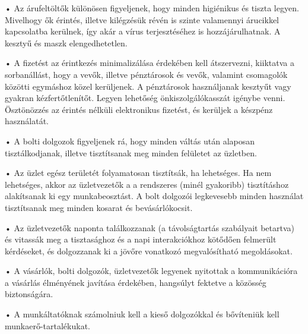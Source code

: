 \documentclass[onecolumn,journal]{IEEEtran}
\begin{document}
\begin{multicols}{2}
• Az árufeltöltők különösen figyeljenek, hogy minden higiénikus és tiszta legyen. Mivelhogy ők érintés, illetve kilégzésük révén is szinte valamennyi árucikkel kapcsolatba kerülnek, így akár a vírus terjesztéséhez is hozzájárulhatnak. A kesztyű és maszk elengedhetetlen.

• A fizetést az érintkezés minimalizálása érdekében kell átszervezni, kiiktatva a sorbanállást, hogy a vevők, illetve pénztárosok és vevők, valamint csomagolók közötti egymáshoz közel kerüljenek. A pénztárosok használjanak kesztyűt vagy gyakran kézfertőtlenítőt. Legyen lehetőség önkiszolgálókasszát igénybe venni. Ösztönözzés az érintés nélküli elektronikus fizetést, és kerüljek a készpénz használatát.

• A bolti dolgozok figyeljenek rá, hogy minden váltás után alaposan tisztálkodjanak, illetve tisztítsanak meg minden felületet az üzletben.

• Az üzlet egész területét folyamatosan tisztítsák, ha lehetséges. Ha nem lehetséges, akkor az üzletvezetők a a rendszeres (minél gyakoribb) tisztításhoz alakítsanak ki egy munkabeosztást. A bolt dolgozói legkevesebb minden használat tisztítsanak meg minden kosarat és bevásárlókocsit.

• Az üzletvezetők naponta találkozzanak (a távolságtartás szabályait betartva) és vitassák meg a tisztasághoz és a napi interakciókhoz kötődően felmerült kérdéseket, és dolgozzanak ki a jövőre vonatkozó megvalósítható megoldásokat. 

• A vásárlók, bolti dolgozók, üzletvezetők legyenek nyitottak a kommunikációra a vásárlás élményének javítása érdekében, hangsúlyt fektetve a közösség biztonságára.

• A munkáltatóknak számolniuk kell a kieső dolgozókkal és bővíteniük kell munkaerő-tartalékukat.








\end{multicols}
\end{document}
